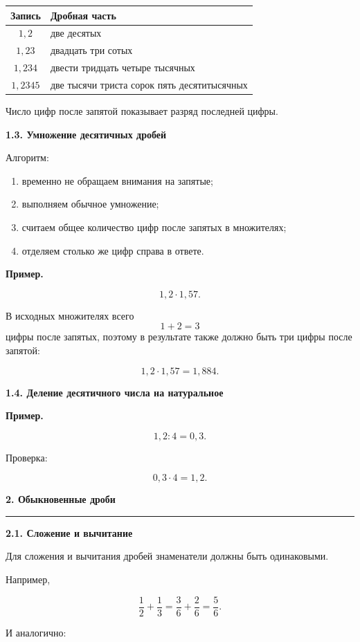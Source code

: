 \documentclass[a4paper,12pt]{article}
\newcommand{\topic}[1]{%
  \vspace{0.7em}
  {\Large\bfseries\color{darkaccent}#1}\par
  \vspace{0.25em}
  {\color{accent}\rule{\linewidth}{0.5pt}}
  \vspace{0.55em}
}
\newcommand{\subtopic}[1]{%
  \vspace{0.4em}
  {\large\bfseries\color{darkaccent}#1}\par
  \vspace{0.15em}
}
\newcommand{\exampletitle}{%
  \par
  \vspace{0.3em}
  \noindent
  \textcolor{accent}{\textbf{Пример.}}\enspace
}
\begin{document}
\begin{center}
\renewcommand{\arraystretch}{1.3}
\begin{tabularx}{0.84\linewidth}{@{}cX@{}}
\toprule
\textbf{Запись} & \textbf{Дробная часть}\\
\midrule
$1{,}2$ & две десятых\\
$1{,}23$ & двадцать три сотых\\
$1{,}234$ & двести тридцать четыре тысячных\\
$1{,}2345$ & две тысячи триста сорок пять десятитысячных\\
\bottomrule
\end{tabularx}
\end{center}

Число цифр после запятой показывает разряд последней цифры.

\subtopic{1.3. Умножение десятичных дробей}

Алгоритм:

\begin{enumerate}
  \item временно не обращаем внимания на запятые;
  \item выполняем обычное умножение;
  \item считаем общее количество цифр после запятых в множителях;
  \item отделяем столько же цифр справа в ответе.
\end{enumerate}

\exampletitle
\[
1{,}2\cdot1{,}57.
\]

В исходных множителях всего
\[
1+2=3
\]
цифры после запятых, поэтому в результате также должно быть
три цифры после запятой:

\[
1{,}2\cdot1{,}57=1{,}884.
\]

\subtopic{1.4. Деление десятичного числа на натуральное}

\exampletitle
\[
1{,}2:4=0{,}3.
\]

Проверка:

\[
0{,}3\cdot4=1{,}2.
\]

\topic{2. Обыкновенные дроби}

\subtopic{2.1. Сложение и вычитание}

Для сложения и вычитания дробей знаменатели должны быть одинаковыми.

Например,

\[
\frac12+\frac13
=
\frac{3}{6}+\frac{2}{6}
=
\frac56.
\]

И аналогично:
\end{document}
